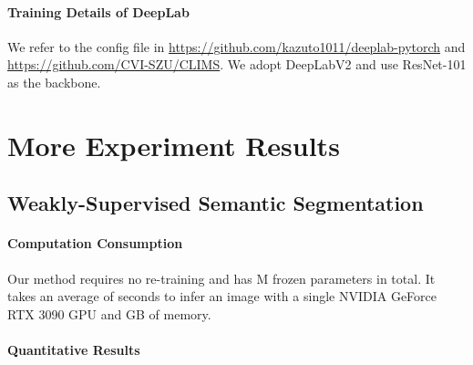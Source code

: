 \documentclass[letterpaper]{article} \usepackage[submission]{aaai24}  \usepackage{times}  \usepackage{helvet}  \usepackage{courier}  \usepackage[hyphens]{url}  \usepackage{graphicx} \urlstyle{rm} \def\UrlFont{\rm}  \usepackage{natbib}  \usepackage{caption} \frenchspacing  \setlength{\pdfpagewidth}{8.5in} \setlength{\pdfpageheight}{11in} \usepackage{algorithm}
\begin{document}
\paragraph{Training Details of DeepLab}

We refer to the config file in \url{https://github.com/kazuto1011/deeplab-pytorch} and \url{https://github.com/CVI-SZU/CLIMS}.
We adopt DeepLabV2 and use ResNet-101 as the backbone.

\section{More Experiment Results}

\subsection{Weakly-Supervised Semantic Segmentation}

\paragraph{Computation Consumption}

Our method requires no re-training and has M frozen parameters in total.
It takes an average of  seconds to infer an image with a single NVIDIA GeForce RTX 3090 GPU and  GB of memory.

\paragraph{Quantitative Results}
\end{document}
